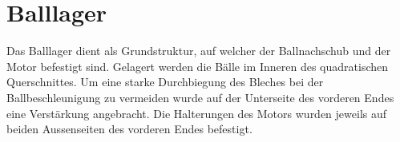 \section{Balllager}
Das Balllager dient als Grundstruktur, auf welcher der Ballnachschub und der Motor befestigt sind. Gelagert werden die Bälle im Inneren des quadratischen Querschnittes. Um eine starke Durchbiegung des Bleches bei der Ballbeschleunigung zu vermeiden wurde auf der Unterseite des vorderen Endes eine Verstärkung angebracht. Die Halterungen des Motors wurden jeweils auf beiden Aussenseiten des vorderen Endes befestigt.